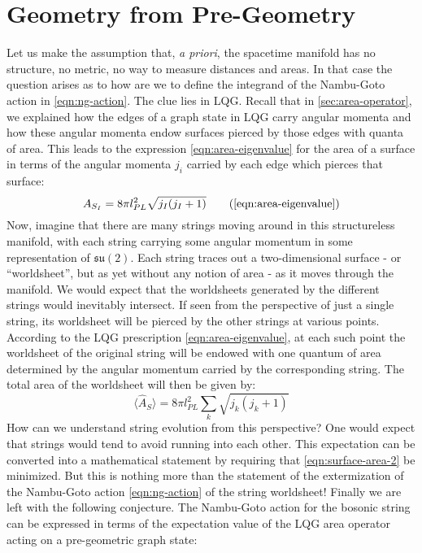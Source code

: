 \documentclass[submission, Phys]{SciPost}
\newcommand{\mf}[1]{\mathfrak{#1}}
\newcommand{\expect}[1]{\langle #1\rangle}
\begin{document}
\section{Geometry from Pre-Geometry}\label{sec:pregeom-2}

Let us make the assumption that, \emph{a priori}, the spacetime manifold has no structure, no metric, no way to measure distances and areas. In that case the question arises as to how are we to define the integrand of the Nambu-Goto action in \eqref{eqn:ng-action}. The clue lies in LQG. Recall that in \autoref{sec:area-operator}, we explained how the edges of a graph state in LQG carry angular momenta and how these angular momenta endow surfaces pierced by those edges with quanta of area. This leads to the expression \eqref{eqn:area-eigenvalue} for the area of a surface in terms of the angular momenta $ j_i $ carried by each edge which pierces that surface:
\begin{equation}\label{eqn:surface-area}
	A_{S_I} = 8\pi l^2_{PL} \sqrt{j_I (j_I + 1)} \tag{\ref{eqn:area-eigenvalue}}
\end{equation}
Now, imagine that there are many strings moving around in this structureless manifold, with each string carrying some angular momentum in some representation of $ \mf{su}(2) $. Each string traces out a two-dimensional surface - or ``worldsheet'', but as yet without any notion of area - as it moves through the manifold. We would expect that the worldsheets generated by the different strings would inevitably intersect. If seen from the perspective of just a single string, its worldsheet will be pierced by the other strings at various points. According to the LQG prescription \eqref{eqn:area-eigenvalue}, at each such point the worldsheet of the original string will be endowed with one quantum of area determined by the angular momentum carried by the corresponding string. The total area of the worldsheet will then be given by:
\begin{equation}\label{eqn:surface-area-2}
		\expect{\hat A_S} = 8 \pi l_{PL}^2 \sum_k \sqrt{ j_k (j_k + 1)}
\end{equation}
How can we understand string evolution from this perspective? One would expect that strings would tend to avoid running into each other. This expectation can be converted into a mathematical statement by requiring that \eqref{eqn:surface-area-2} be minimized. But this is nothing more than the statement of the extermization of the Nambu-Goto action \eqref{eqn:ng-action} of the string worldsheet! Finally we are left with the following conjecture. The Nambu-Goto action for the bosonic string can be expressed in terms of the expectation value of the LQG area operator acting on a pre-geometric graph state:
\end{document}
